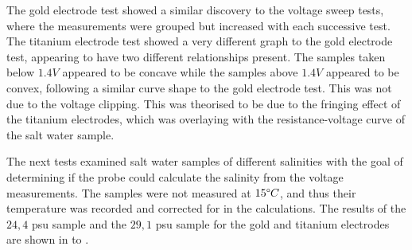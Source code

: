 The gold electrode test showed a similar discovery to the voltage sweep tests, where the measurements were grouped but increased with each successive test.
The titanium electrode test showed a very different graph to the gold electrode test, appearing to have two different relationships present.
The samples taken below $1.4V$ appeared to be concave while the samples above $1.4V$ appeared to be convex, following a similar curve shape to the gold electrode test.
This was not due to the voltage clipping.
This was theorised to be due to the fringing effect of the titanium electrodes, which was overlaying with the resistance-voltage curve of the salt water sample.

The next tests examined salt water samples of different salinities with the goal of determining if the probe could calculate the salinity from the voltage measurements.
The samples were not measured at $15\degree C$, and thus their temperature was recorded and corrected for in the calculations.
The results of the $24,4$ \gls{psu} sample and the $29,1$ \gls{psu} sample for the gold and titanium electrodes are shown in  to .

